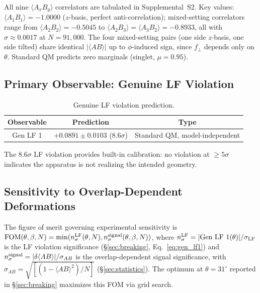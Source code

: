 \documentclass[twocolumn,aps,pra,superscriptaddress,floatfix,10pt]{revtex4-2}
\begin{document}
All nine $\langle A_x B_y\rangle$ correlators are tabulated in Supplemental~S2. Key values:
$\langle A_1 B_1\rangle = -1.0000$ ($z$-basis, perfect anti-correlation); mixed-setting correlators
range from $\langle A_2 B_2\rangle = -0.5045$ to $\langle A_2 B_3\rangle = \langle A_3 B_2\rangle = -0.8933$, all with
$\sigma \approx 0.0017$ at $N = 91{,}000$. The four mixed-setting pairs (one side $z$-basis,
one side tilted) share identical $|\langle AB\rangle|$ up to $\phi$-induced sign, since $f_\perp$
depends only on $\theta$. Standard QM predicts zero marginals (singlet, $\mu = 0.95$).

\subsection{Primary Observable: Genuine LF Violation}
\label{sec:primary_obs}

\begin{table}[H]
\centering
\caption{Genuine LF violation prediction.}
\label{tab:gen_lf}
\begin{tabular}{ccc}
\toprule
Observable & Prediction & Type \\
\midrule
Gen LF 1 & $+0.0891 \pm 0.0103$ ($8.6\sigma$) & Standard QM, model-independent \\
\bottomrule
\end{tabular}
\end{table}

The $8.6\sigma$ LF violation provides built-in calibration: no violation at $\ge 5\sigma$
indicates the apparatus is not realizing the intended geometry.

\subsection{Sensitivity to Overlap-Dependent Deformations}
\label{sec:sensitivity}

The figure of merit governing experimental sensitivity is
$\text{FOM}(\theta, \beta, N) = \min(n_\sigma^{\rm LF}(\theta, N), n_\sigma^{\rm signal}(\theta, \beta, N))$, where
$n_\sigma^{\rm LF} = |\text{Gen LF 1}(\theta)|/\sigma_{\rm LF}$ is the LF violation significance
(\S\ref{sec:breaking}, Eq.~\ref{eq:gen_lf1}) and $n_\sigma^{\rm signal} = |\delta\langle AB\rangle|/\sigma_{AB}$ is the overlap-dependent
signal significance, with $\sigma_{AB} = \sqrt{[(1 - \langle AB\rangle^2)/N]}$ (\S\ref{sec:statistics}). The optimum
at $\theta = 31^\circ$ reported in \S\ref{sec:breaking} maximizes this FOM via grid search.
\end{document}
